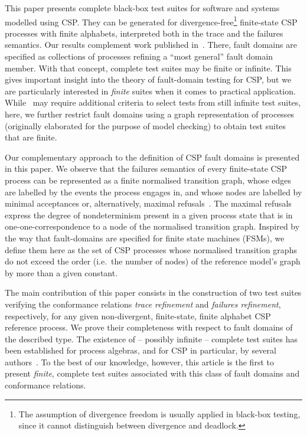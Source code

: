 This paper presents complete black-box test suites for software and systems
modelled using CSP.
They can be generated for divergence-free\footnote{The assumption of divergence freedom is usually
applied in black-box testing, since it cannot distinguish between divergence
and deadlock.} finite-state CSP processes with finite alphabets,   
interpreted both in the trace and the failures semantics.
Our results complement work published in~\cite{DBLP:conf/pts/CavalcantiS17}.
There, fault domains are specified as collections of processes refining a
``most general'' fault domain member. With that concept, complete test suites
may be finite or infinite. This gives important insight into the theory of
fault-domain testing for CSP, but we are particularly interested in {\it
finite} suites when it comes to practical application.
While~\cite{DBLP:conf/pts/CavalcantiS17} may require additional criteria to
select tests from still infinite test suites, here, we further restrict fault
domains using a graph representation of processes (originally elaborated
for the purpose of model checking) to
obtain test suites that are finite.

Our complementary approach to the definition of CSP fault domains is
presented in this paper. We observe that the failures semantics of 
every finite-state CSP process can
be represented as a finite normalised transition graph, whose edges are
labelled by the events the process engages in, and whose nodes are labelled
by minimal acceptances or, alternatively, maximal
refusals~\cite{Roscoe:1994:CME:197600}. The maximal refusals express the
degree of nondeterminism present in a given process state that is in
one-one-correspondence to a node of the normalised transition graph. Inspired
by the way that fault-domains are specified for finite state machines (FSMs),
we define them here as the set of CSP processes whose normalised transition graphs
do not exceed the order (i.e.~the number of nodes) 
of the reference model's graph by more than a given
constant.

The main contribution of this paper consists in the construction of two test suites
verifying the conformance relations \emph{trace refinement} and  \emph{failures refinement}, respectively, for any given non-divergent, finite-state, finite alphabet 
CSP reference process. We prove their completeness with respect to fault domains
of the described type.  The
existence of -- possibly infinite -- complete test suites has been
established for process algebras, and for CSP in particular, by several
authors~\cite{Hennessy:1988:ATP:50497,Schneider:1995:OST:203471.203475,DBLP:conf/fm/PeleskaS96,peleska1997a,DBLP:conf/icfem/CavalcantiG07,DBLP:conf/pts/CavalcantiS17}.
To the best of our knowledge, however, this article is the first to present
{\it finite}, complete test suites associated with this class of fault
domains and conformance relations.

